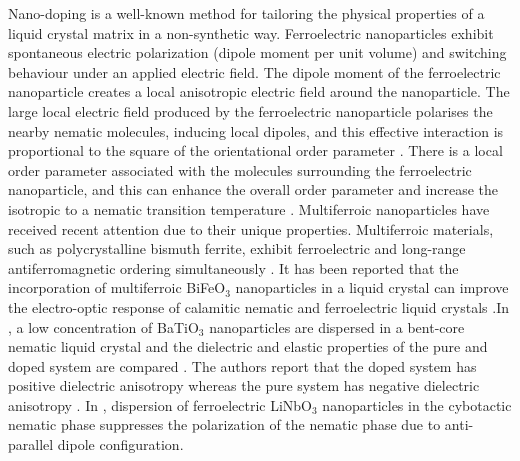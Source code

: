 \documentclass[reprint,amsfonts,amsmath,amssymb,aps,pre,floatfix,10pt]{revtex4-1}
\begin{document}
Nano-doping is a well-known method for tailoring the physical properties of a liquid crystal matrix in a non-synthetic way. Ferroelectric nanoparticles exhibit spontaneous electric polarization (dipole moment per unit volume) and switching behaviour under an applied electric field. The dipole moment of the ferroelectric nanoparticle creates a local anisotropic electric field around the nanoparticle. The large local electric field produced by the ferroelectric nanoparticle polarises the nearby nematic molecules, inducing local dipoles, and this effective interaction is proportional to the square of the orientational order parameter \cite{li2006orientational_14}. There is a local order parameter associated with the molecules surrounding the ferroelectric nanoparticle, and this can enhance the overall order parameter and increase the isotropic to a nematic transition temperature \cite{lopatina2009theory_13}. Multiferroic nanoparticles have received recent attention due to their unique properties. Multiferroic materials, such as polycrystalline bismuth ferrite, exhibit ferroelectric and long-range antiferromagnetic ordering simultaneously \cite{kalinin2002potential_15,seidel2009conduction_16}. It has been reported that the incorporation of multiferroic BiFeO$_{3}$ nanoparticles in a liquid crystal can improve the electro-optic response of calamitic nematic and ferroelectric liquid crystals \cite{nayek2015superior_17, khan2020bismuth_18, ghosh2011effect_19}.In \cite{khan2017elastic_11}, a low concentration of BaTiO$_{3}$ nanoparticles are dispersed in a bent-core nematic liquid crystal and the dielectric and elastic properties of the pure and doped system are compared \cite{khan2017elastic_11}. The authors report that the doped system has positive dielectric anisotropy whereas the pure system has negative dielectric anisotropy \cite{khan2017elastic_11}. In \cite{derbali2020dielectric_33}, dispersion of ferroelectric LiNbO$_{3}$ nanoparticles in the cybotactic nematic phase suppresses the polarization of the nematic phase due to anti-parallel dipole configuration.
\end{document}
